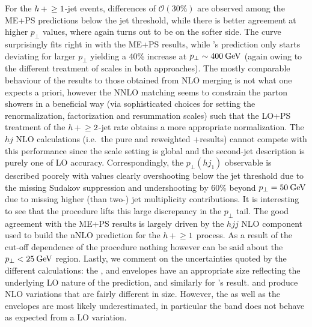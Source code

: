 For the $h\!\text{~+~}\!\ge1$-jet events, differences of $\mathcal{O}(30\%)$ are
observed among the ME+PS predictions below the jet threshold, while
there is better agreement at higher $p_\perp$ values, where again
\Herwig turns out to be on the softer side. The \Powheg curve
surprisingly fits right in with the ME+PS results, while \Sherpa's
\NNLOPS prediction only starts deviating for larger $p_\perp$ yielding
a 40\% increase at $p_\perp\sim400\text{\:GeV}$ (again owing to the different
treatment of scales in both approaches). The mostly comparable
behaviour of the \NNLOPS results to those obtained from NLO merging is
not what one expects a priori, however the NNLO matching seems to
constrain the parton showers in a beneficial way (via sophisticated
choices for setting the renormalization, factorization and resummation
scales) such that the LO+PS treatment of the $h\!\text{~+~}\!\ge2$-jet rate
obtains a more appropriate normalization. The $hj$ NLO calculations
(i.e.~the pure and \Minlo reweighted \GoSam+\Sherpa results) cannot
compete with this performance since the scale setting is global and
the second-jet description is purely one of LO accuracy.
Correspondingly, the $p_\perp(hj_1)$ observable is described poorely
with values clearly overshooting below the jet threshold due to the
missing Sudakov suppression and undershooting by 60\% beyond
$p_\perp=50\text{\:GeV}$ due to missing higher (than two-) jet multiplicity
contributions. It is interesting to see that the \Loopsim procedure
lifts this large discrepancy in the $p_\perp$ tail. The good agreement
with the ME+PS results is largely driven by the $hjj$ NLO component
used to build the nNLO prediction for the $h\!\text{~+~}\!\ge1$ process. As a
result of the cut-off dependence of the procedure nothing however can
be said about the $p_\perp<25\text{\:GeV}$ region. Lastly, we comment on the
uncertainties quoted by the different calculations: the \GoSam, \Minlo
and \Loopsim envelopes have an appropriate size reflecting the
underlying LO nature of the prediction, and similarly for \Sherpa's
\NNLOPS result. \MGaMC and \Herwig produce NLO variations that are
fairly different in size. However, the \Herwig as well as the \Powheg
envelopes are most likely underestimated, in particular the \Powheg
band does not behave as expected from a LO variation.


